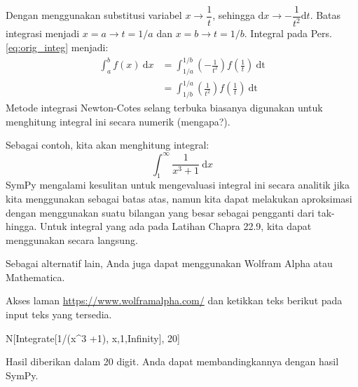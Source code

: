 Dengan menggunakan substitusi variabel $x \rightarrow \dfrac{1}{t}$, sehingga
$\mathrm{d}x \rightarrow -\dfrac{1}{t^2} \mathrm{d}t$. Batas integrasi menjadi
$x=a \rightarrow t=1/a$ dan $x=b \rightarrow t=1/b$.
Integral pada Pers. \eqref{eq:orig_integ} menjadi:
\begin{align*}
\int_{a}^{b} f(x)\ \mathrm{d}x & = \int_{1/a}^{1/b}
\left( -\frac{1}{t^2} \right) f\left(\frac{1}{t}\right)\ \mathrm{dt} \\
& = \int_{1/b}^{1/a}
\left( \frac{1}{t^2} \right) f\left(\frac{1}{t}\right)\ \mathrm{dt}
\end{align*}
Metode integrasi Newton-Cotes selang terbuka biasanya digunakan
untuk menghitung integral ini secara numerik (mengapa?).

Sebagai contoh, kita akan menghitung integral:
\begin{equation}
\int_{1}^{\infty} \frac{1}{x^3 + 1}\ \mathrm{d}x
\end{equation}
SymPy mengalami kesulitan untuk mengevaluasi integral ini secara analitik
jika kita menggunakan  sebagai batas atas, namun kita
dapat melakukan aproksimasi dengan menggunakan suatu bilangan yang besar
sebagai pengganti dari tak-hingga. Untuk integral yang ada pada
Latihan Chapra 22.9, kita dapat menggunakan  secara
langsung.

Sebagai alternatif lain, Anda juga dapat menggunakan Wolfram Alpha
atau Mathematica.

Akses laman
{\scriptsize\url{https://www.wolframalpha.com/}} dan ketikkan teks
berikut pada input teks yang tersedia.
\begin{textcode}
N[Integrate[1/(x^3 +1), {x,1,Infinity}], 20]
\end{textcode}
Hasil diberikan dalam 20 digit. Anda dapat membandingkannya dengan hasil SymPy.


